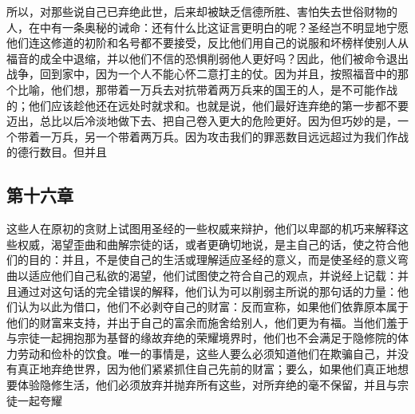 所以，对那些说自己已弃绝此世，后来却被缺乏信德所胜、害怕失去世俗财物的人，在中有一条奥秘的诫命：还有什么比这证言更明白的呢？圣经岂不明显地宁愿他们连这修道的初阶和名号都不要接受，反比他们用自己的说服和坏榜样使别人从福音的成全中退缩，并以他们不信的恐惧削弱他人更好吗？因此，他们被命令退出战争，回到家中，因为一个人不能心怀二意打主的仗。因为并且，按照福音中的那个比喻，他们想，那带着一万兵去对抗带着两万兵来的国王的人，是不可能作战的；他们应该趁他还在远处时就求和。也就是说，他们最好连弃绝的第一步都不要迈出，总比以后冷淡地做下去、把自己卷入更大的危险更好。因为但巧妙的是，一个带着一万兵，另一个带着两万兵。因为攻击我们的罪恶数目远远超过为我们作战的德行数目。但并且\par


\subsection{第十六章}

\par

这些人在原初的贪财上试图用圣经的一些权威来辩护，他们以卑鄙的机巧来解释这些权威，渴望歪曲和曲解宗徒的话，或者更确切地说，是主自己的话，使之符合他们的目的：并且，不是使自己的生活或理解适应圣经的意义，而是使圣经的意义弯曲以适应他们自己私欲的渴望，他们试图使之符合自己的观点，并说经上记载：并且通过对这句话的完全错误的解释，他们认为可以削弱主所说的那句话的力量：他们认为以此为借口，他们不必剥夺自己的财富：反而宣称，如果他们依靠原本属于他们的财富来支持，并出于自己的富余而施舍给别人，他们更为有福。当他们羞于与宗徒一起拥抱那为基督的缘故弃绝的荣耀境界时，他们也不会满足于隐修院的体力劳动和俭朴的饮食。唯一的事情是，这些人要么必须知道他们在欺骗自己，并没有真正地弃绝世界，因为他们紧紧抓住自己先前的财富；要么，如果他们真正地想要体验隐修生活，他们必须放弃并抛弃所有这些，对所弃绝的毫不保留，并且与宗徒一起夸耀\par

